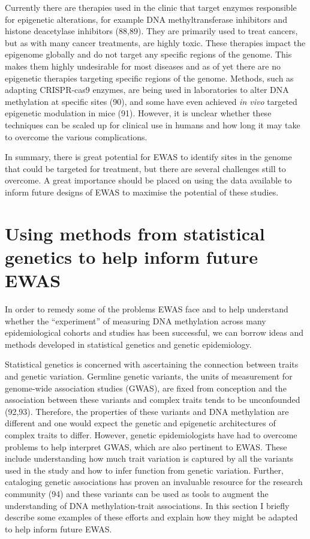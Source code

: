 \documentclass[11pt,oneside]{bristolthesis}
\begin{document}
Currently there are therapies used in the clinic that target enzymes responsible for epigenetic alterations, for example DNA methyltransferase inhibitors and histone deacetylase inhibitors (88,89). They are primarily used to treat cancers, but as with many cancer treatments, are highly toxic. These therapies impact the epigenome globally and do not target any specific regions of the genome. This makes them highly undesirable for most diseases and as of yet there are no epigenetic therapies targeting specific regions of the genome. Methods, such as adapting CRISPR-cas9 enzymes, are being used in laboratories to alter DNA methylation at specific sites (90), and some have even achieved \emph{in vivo} targeted epigenetic modulation in mice (91). However, it is unclear whether these techniques can be scaled up for clinical use in humans and how long it may take to overcome the various complications.

In summary, there is great potential for EWAS to identify sites in the genome that could be targeted for treatment, but there are several challenges still to overcome. A great importance should be placed on using the data available to inform future designs of EWAS to maximise the potential of these studies.

\hypertarget{genetics-in-ewas}{%
\section{Using methods from statistical genetics to help inform future EWAS}\label{genetics-in-ewas}}

In order to remedy some of the problems EWAS face and to help understand whether the ``experiment'' of measuring DNA methylation across many epidemiological cohorts and studies has been successful, we can borrow ideas and methods developed in statistical genetics and genetic epidemiology.

Statistical genetics is concerned with ascertaining the connection between traits and genetic variation. Germline genetic variants, the units of measurement for genome-wide association studies (GWAS), are fixed from conception and the association between these variants and complex traits tends to be unconfounded (92,93). Therefore, the properties of these variants and DNA methylation are different and one would expect the genetic and epigenetic architectures of complex traits to differ. However, genetic epidemiologists have had to overcome problems to help interpret GWAS, which are also pertinent to EWAS. These include understanding how much trait variation is captured by all the variants used in the study and how to infer function from genetic variation. Further, cataloging genetic associations has proven an invaluable resource for the research community (94) and these variants can be used as tools to augment the understanding of DNA methylation-trait associations. In this section I briefly describe some examples of these efforts and explain how they might be adapted to help inform future EWAS.
\end{document}
